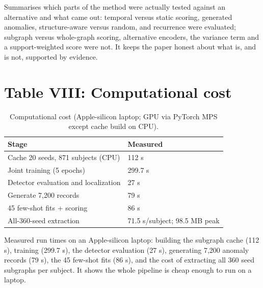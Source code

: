 \documentclass[11pt]{article}
\begin{document}
\smallskip
Summarises which parts of the method were actually tested against an alternative and what came out: temporal versus static scoring, generated anomalies, structure-aware versus random, and recurrence were evaluated; subgraph versus whole-graph scoring, alternative encoders, the variance term and a support-weighted score were not. It keeps the paper honest about what is, and is not, supported by evidence.

\bigskip
\section*{Table VIII: Computational cost}
\begin{table}[!tbp]
\caption{Computational cost (Apple-silicon laptop; GPU via PyTorch MPS except cache build on CPU).}
\label{tab:cost}
\centering\footnotesize
\begin{tabular}{@{}p{4.1cm}p{3.7cm}@{}}
\toprule
Stage & Measured \\
\midrule
Cache 20 seeds, 871 subjects (CPU) & 112 s \\
Joint training (5 epochs) & 299.7 s \\
Detector evaluation and localization & 27 s \\
Generate 7,200 records & 79 s \\
45 few-shot fits + scoring & 86 s \\
All-360-seed extraction & 71.5 s/subject; 98.5 MB peak \\
\bottomrule
\end{tabular}
\end{table}

\smallskip
Measured run times on an Apple-silicon laptop: building the subgraph cache (112 s), training (299.7 s), the detector evaluation (27 s), generating 7,200 anomaly records (79 s), the 45 few-shot fits (86 s), and the cost of extracting all 360 seed subgraphs per subject. It shows the whole pipeline is cheap enough to run on a laptop.

\bigskip
\end{document}
